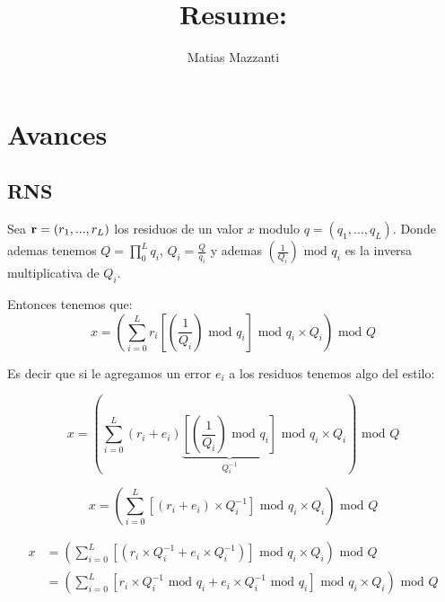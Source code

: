 \documentclass[12pt, oneside]{article}
\title{Resume: }
\author{Matias Mazzanti}
\date{}
\begin{document}
\maketitle
\tableofcontents

\section{Avances}

\subsection{RNS}

Sea $\bold{r} = (r_1, ..., r_L)$ los residuos de un valor $x$ modulo $q = (q_1, ...,q_L)$.
Donde ademas tenemos $Q = \prod_0^L q_i$, $Q_i = \frac{Q}{q_i}$ y ademas $\left(\frac{1}{Q_{i}}\right)\text{ mod } q_i$ es la inversa multiplicativa de $Q_i$.

Entonces tenemos que:
\begin{equation}
    x = \left(\sum_{i=0}^L r_i\left[\left(\frac{1}{Q_{i}}\right)\text{ mod } q_i\right]\text{ mod } q_i \times Q_i\right) \text{ mod } Q
\end{equation}

Es decir que si le agregamos un error $e_i$ a los residuos tenemos algo del estilo:

\begin{equation}
    x = \left(\sum_{i=0}^L (r_i+e_i)\underbrace{\left[\left(\frac{1}{Q_{i}}\right)\text{ mod } q_i\right]}_{Q_i^{-1}}\text{ mod } q_i \times Q_i\right) \text{ mod } Q
\end{equation}

\begin{equation}
    x = \left(\sum_{i=0}^L \left[(r_i+e_i)\times Q_i^{-1}\right]\text{ mod } q_i \times Q_i\right) \text{ mod } Q
\end{equation}

\begin{equation}
    \begin{split}
        x &= \left(\sum_{i=0}^L \left[(r_i\times Q_i^{-1} +e_i\times Q_i^{-1})\right]\text{ mod } q_i \times Q_i\right) \text{ mod } Q \\
          &= \left(\sum_{i=0}^L \left[r_i\times Q_i^{-1} \text{ mod } q_i +e_i\times Q_i^{-1}\text{ mod } q_i \right]\text{ mod } q_i \times Q_i\right) \text{ mod } Q \\
    \end{split}
\end{equation}
\end{document}
